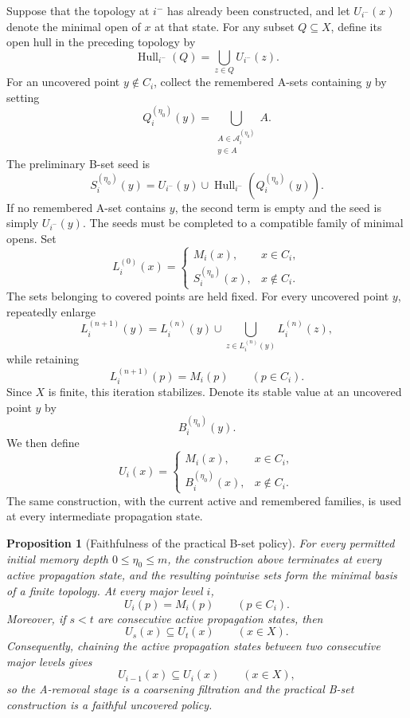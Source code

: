 \documentclass[a4paper,11pt]{article}
\newtheorem{proposition}[proposition]{Proposition}
\theoremstyle{definition}
\theoremstyle{remark}
\begin{document}
Suppose that the topology at $i^{-}$ has already been constructed, and let $U_{i^{-}}(x)$ denote the minimal open of $x$ at that state. For any subset $Q\subseteq X$, define its open hull in the preceding topology by
$$
\operatorname{Hull}_{i^{-}}(Q) = \bigcup_{z\in Q}U_{i^{-}}(z).
$$
For an uncovered point $y\notin C_i$, collect the remembered A-sets containing $y$ by setting
$$
Q_i^{(\eta_0)}(y) = \bigcup_{\substack{A\in\mathcal A_i^{(\eta_0)}\\y\in A}}A.
$$
The preliminary B-set seed is
$$
S_i^{(\eta_0)}(y) = U_{i^{-}}(y) \cup \operatorname{Hull}_{i^{-}}\!\left(Q_i^{(\eta_0)}(y)\right).
$$
If no remembered A-set contains $y$, the second term is empty and the seed is simply $U_{i^{-}}(y)$. The seeds must be completed to a compatible family of minimal opens. Set
$$
L_i^{(0)}(x) = 
\begin{cases}
M_i(x),&x\in C_i,\\
S_i^{(\eta_0)}(x),&x\notin C_i.
\end{cases}
$$
The sets belonging to covered points are held fixed. For every uncovered point $y$, repeatedly enlarge
$$
L_i^{(n+1)}(y) = L_i^{(n)}(y)\cup \bigcup_{z\in L_i^{(n)}(y)}L_i^{(n)}(z),
$$
while retaining
$$
L_i^{(n+1)}(p) = M_i(p)\qquad(p\in C_i).
$$
Since $X$ is finite, this iteration stabilizes. Denote its stable value at an uncovered point $y$ by
$$
B_i^{(\eta_0)}(y).
$$
We then define
$$
U_i(x) = 
\begin{cases}
M_i(x),&x\in C_i,\\
B_i^{(\eta_0)}(x),&x\notin C_i.
\end{cases}
$$
The same construction, with the current active and remembered families, is used at every intermediate propagation state.


\begin{proposition}[Faithfulness of the practical B-set policy]
\label{prop:practical-b-faithful}
For every permitted initial memory depth $0\leq\eta_0\leq m$, the construction above terminates at every active propagation state, and the resulting pointwise sets form the minimal basis of a finite topology. At every major level $i$,
$$
U_i(p)=M_i(p)\qquad(p\in C_i).
$$
Moreover, if $s<t$ are consecutive active propagation states, then
$$
U_s(x)\subseteq U_t(x)\qquad(x\in X).
$$
Consequently, chaining the active propagation states between two consecutive major levels gives
$$
U_{i-1}(x)\subseteq U_i(x)\qquad(x\in X),
$$
so the A-removal stage is a coarsening filtration and the practical B-set construction is a faithful uncovered policy.
\end{proposition}
\end{document}
